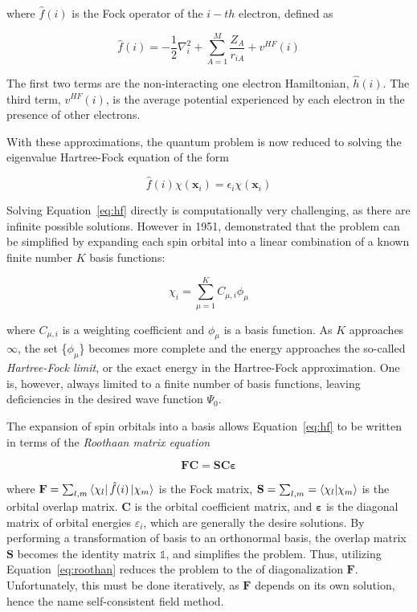 \begin{doublespace}
\noindent where $\hat{f}(i)$ is the Fock operator of the $i-th$ electron,
defined as

\begin{equation}
  \hat{f}(i) = -\frac{1}{2}\nabla^2_i + \sum_{A=1}^M\frac{Z_A}{r_{iA}} + v^{HF}(i)
\end{equation}

\noindent The first two terms are the non-interacting one electron Hamiltonian,
$\hat{h}(i)$. The third term, $v^{HF}(i)$, is the average potential experienced
by each electron in the presence of other electrons.

With these approximations, the quantum problem is now reduced to solving the
eigenvalue Hartree-Fock equation of the form

\begin{equation}
\hat{f}(i)\chi(\mathbf{x}_i) = \epsilon_i\chi(\mathbf{x}_i)
\label{eq:hf}
\end{equation}

Solving Equation~\ref{eq:hf} directly is computationally very challenging, as
there are infinite possible solutions.  However in 1951, \citet{Roothaan1951}
demonstrated that the problem can be simplified by expanding each spin orbital
into a linear combination of a known finite number $K$ basis functions:

\begin{equation}
\chi_i = \sum_{\mu=1}^K C_{\mu,i}\phi_{\mu}
\end{equation}

\noindent where $C_{\mu,i}$ is a weighting coefficient and $\phi_{\mu}$ is a
basis function. As $K$ approaches $\infty$, the set \{$\phi_{\mu}$\} becomes
more complete and the energy approaches the so-called \emph{Hartree-Fock
limit}, or the exact energy in the Hartree-Fock approximation. One is, however,
always limited to a finite number of basis functions, leaving deficiencies in
the desired wave function $\Psi_0$.

The expansion of spin orbitals into a basis allows Equation~\ref{eq:hf} to be
written in terms of the \emph{Roothaan matrix equation}

\begin{equation}
\mathbf{F}\mathbf{C} = \mathbf{S}\mathbf{C}\mathbf{\varepsilon}
\label{eq:roothan}
\end{equation}

\noindent where $\mathbf{F} = \sum_{l,m} \bra{\chi_l} \hat{f}(i) \ket{\chi_m}$
is the Fock matrix, $\mathbf{S} = \sum_{l,m} = \bra{\chi_l}\ket{\chi_m}$ is the
orbital overlap matrix. $\mathbf{C}$ is the orbital coefficient matrix, and
$\mathbf{\varepsilon}$ is the diagonal matrix of orbital energies
$\varepsilon_i$, which are generally the desire solutions. By performing a
transformation of basis to an orthonormal basis, the overlap matrix
$\mathbf{S}$ becomes the identity matrix $\mathbb{1}$, and simplifies the
problem. Thus, utilizing Equation~\ref{eq:roothan} reduces the problem to the of
diagonalization $\mathbf{F}$. Unfortunately, this must be done iteratively, as
$\mathbf{F}$ depends on its own solution, hence the name self-consistent field
method.


\end{doublespace}

